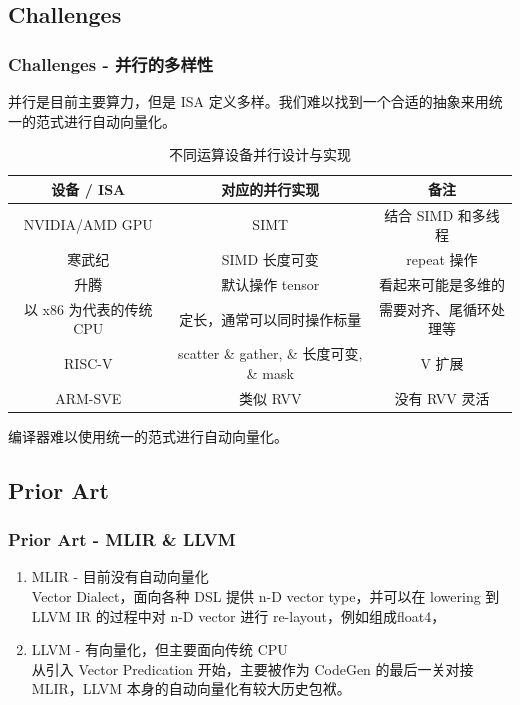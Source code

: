 \documentclass[aspectratio=169]{ctexbeamer}
\begin{document}
\subsection{Challenges}
\begin{frame}
    \frametitle{Challenges - 并行的多样性}

    并行是目前主要算力，但是 ISA 定义多样。我们难以找到一个合适的抽象来用统一的范式进行自动向量化。

    \begin{table}
        \centering
        \caption{不同运算设备并行设计与实现}
        \scriptsize
        \begin{tabular}{ccc}
            \toprule
            设备 / ISA         & 对应的并行实现                             & 备注           \\
            \midrule
            NVIDIA/AMD GPU   & SIMT                                & 结合 SIMD 和多线程 \\
            寒武纪              & SIMD 长度可变                           & repeat 操作    \\
            升腾               & 默认操作 tensor                         & 看起来可能是多维的    \\
            以 x86 为代表的传统 CPU & 定长，通常可以同时操作标量                       & 需要对齐、尾循环处理等  \\
            RISC-V           & scatter \& gather, \& 长度可变, \& mask & V 扩展         \\
            ARM-SVE          & 类似 RVV                              & 没有 RVV 灵活    \\
            \bottomrule
        \end{tabular}
    \end{table}

    编译器难以使用统一的范式进行自动向量化。

\end{frame}

\subsection{Prior Art}

\begin{frame}
    \frametitle{Prior Art - MLIR \& LLVM}

    \begin{enumerate}
        \item MLIR - 目前没有自动向量化 \\
              Vector Dialect，面向各种 DSL 提供 n-D vector type，并可以在 lowering 到 LLVM IR 的过程中对 n-D vector 进行 re-layout，例如组成float4，
        \item LLVM - 有向量化，但主要面向传统 CPU \\
              从引入 Vector Predication 开始，主要被作为 CodeGen 的最后一关对接 MLIR，LLVM 本身的自动向量化有较大历史包袱。
    \end{enumerate}
\end{frame}
\end{document}
